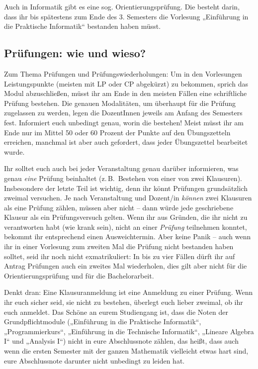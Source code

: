 Auch in Informatik gibt es eine sog. Orientierungsprüfung. Die besteht darin, dass ihr bis spätestens zum Ende des 3. Semesters die Vorlesung „Einführung in die Praktische Informatik“ bestanden haben müsst.


\subsection{Prüfungen: wie und wieso?}

Zum Thema Prüfungen und Prüfungswiederholungen: Um in den Vorlesungen Leistungspunkte (meisten mit \gls{LP} oder \gls{CP} abgekürzt) zu bekommen, sprich das Modul abzuschließen, müsst ihr am Ende in den meisten Fällen eine schriftliche Prüfung bestehen. Die genauen Modalitäten, um überhaupt für die Prüfung zugelassen zu werden, legen die DozentInnen jeweils am Anfang des Semesters fest. Informiert euch unbedingt genau, worin die bestehen! Meist müsst ihr am Ende nur im Mittel 50 oder 60 Prozent der Punkte auf den Übungszetteln erreichen, manchmal ist aber auch gefordert, dass jeder Übungszettel bearbeitet wurde.

Ihr solltet euch auch bei jeder Veranstaltung genau darüber informieren, was genau \emph{eine} Prüfung beinhaltet (z.\,B.\ Bestehen von einer von zwei Klausuren). Insbesondere der letzte Teil ist wichtig, denn ihr könnt Prüfungen grundsätzlich zweimal versuchen. Je nach Veranstaltung und Dozent/in \emph{können} zwei Klausuren als eine Prüfung zählen, müssen aber nicht -- dann würde jede geschriebene Klausur als ein Prüfungsversuch gelten. Wenn ihr aus Gründen, die ihr nicht zu verantworten habt (wie krank sein), nicht an einer \emph{Prüfung} teilnehmen konntet, bekommt ihr entsprechend einen Ausweichtermin. Aber keine Panik -- auch wenn ihr in einer Vorlesung zum zweiten Mal die Prüfung nicht bestanden haben solltet, seid ihr noch nicht exmatrikuliert: In bis zu vier Fällen dürft ihr auf Antrag Prüfungen auch ein zweites Mal wiederholen, dies gilt aber nicht für die Orientierungsprüfung und für die Bachelorarbeit.

Denkt dran: Eine Klausuranmeldung ist eine Anmeldung zu einer Prüfung. Wenn ihr euch sicher seid, sie nicht zu bestehen, überlegt euch lieber zweimal, ob ihr euch anmeldet. Das Schöne an eurem Studiengang ist, dass die Noten der Grundpflichtmodule („Einführung in die Praktische Informatik“, „Programmierkurs“, „Einführung in die Technische Informatik“, „Lineare Algebra I“ und „Analysis I“) nicht in eure Abschlussnote zählen, das heißt, dass auch wenn die ersten Semester mit der ganzen Mathematik vielleicht etwas hart sind, eure Abschlussnote darunter nicht unbedingt zu leiden hat.


\vspace{-\parskip}

